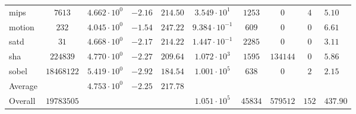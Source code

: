 \begin{tabular}{|l|c|HHc|c|c|c|cH|}
mips          & $ 7613     $ & $ 4.662 \cdot 10^{0} $ & $ -2.16 $ & $ 214.50 $ & $ 3.549 \cdot 10^{1}  $ & $ 1253  $ & $ 0      $ & $ 4   $ & $ 5.10    $ \\
motion        & $ 232      $ & $ 4.045 \cdot 10^{0} $ & $ -1.54 $ & $ 247.22 $ & $ 9.384 \cdot 10^{-1} $ & $ 609   $ & $ 0      $ & $ 0   $ & $ 6.61    $ \\
satd          & $ 31       $ & $ 4.668 \cdot 10^{0} $ & $ -2.17 $ & $ 214.22 $ & $ 1.447 \cdot 10^{-1} $ & $ 2285  $ & $ 0      $ & $ 0   $ & $ 3.11    $ \\
sha           & $ 224839   $ & $ 4.770 \cdot 10^{0} $ & $ -2.27 $ & $ 209.64 $ & $ 1.072 \cdot 10^{3}  $ & $ 1595  $ & $ 134144 $ & $ 0   $ & $ 5.86    $ \\
sobel         & $ 18468122 $ & $ 5.419 \cdot 10^{0} $ & $ -2.92 $ & $ 184.54 $ & $ 1.001 \cdot 10^{5}  $ & $ 638   $ & $ 0      $ & $ 2   $ & $ 2.15    $ \\
\hline
Average       & $          $ & $ 4.753 \cdot 10^{0} $ & $ -2.25 $ & $ 217.78 $ & $                     $ & $       $ & $        $ & $     $ & $         $ \\
\hline
Overall       & $ 19783505 $ & $                    $ & $       $ & $        $ & $ 1.051 \cdot 10^{5}  $ & $ 45834 $ & $ 579512 $ & $ 152 $ & $ 437.90  $ \\
\hline
\end{tabular}
